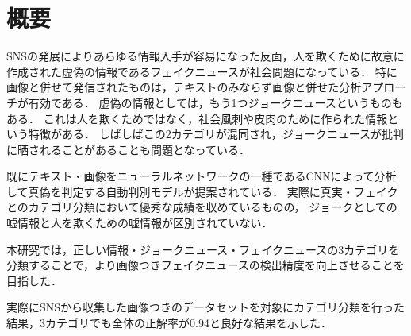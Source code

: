 \chapter{概要}

SNSの発展によりあらゆる情報入手が容易になった反面，人を欺くために故意に作成された虚偽の情報であるフェイクニュースが社会問題になっている．
特に画像と併せて発信されたものは，テキストのみならず画像と併せた分析アプローチが有効である．
虚偽の情報としては，もう1つジョークニュースというものもある．
これは人を欺くためではなく，社会風刺や皮肉のために作られた情報という特徴がある．
しばしばこの2カテゴリが混同され，ジョークニュースが批判に晒されることがあることも問題となっている．

既にテキスト・画像をニューラルネットワークの一種であるCNNによって分析して真偽を判定する自動判別モデルが提案されている．
実際に真実・フェイクとのカテゴリ分類において優秀な成績を収めているものの，
ジョークとしての嘘情報と人を欺くための嘘情報が区別されていない．


本研究では，正しい情報・ジョークニュース・フェイクニュースの3カテゴリを分類することで，より画像つきフェイクニュースの検出精度を向上させることを目指した．


実際にSNSから収集した画像つきのデータセットを対象にカテゴリ分類を行った結果，3カテゴリでも全体の正解率が0.94と良好な結果を示した．



%